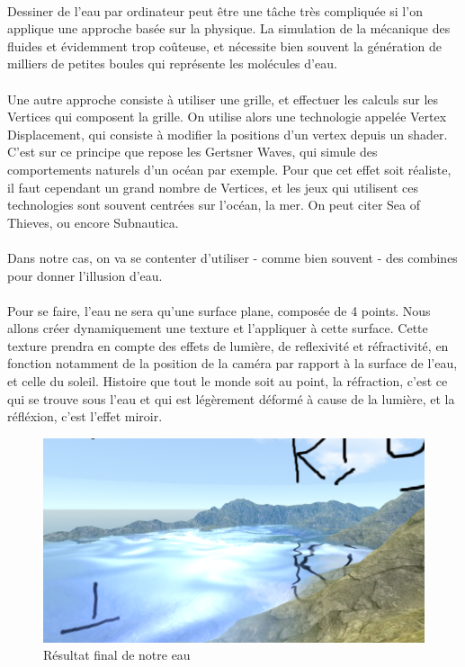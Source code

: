 \documentclass{EPUProjetDi}
\begin{document}
\paragraph{}
Dessiner de l'eau par ordinateur peut être une tâche très compliquée si l'on applique une approche basée sur la physique. La simulation de la mécanique des fluides et évidemment trop coûteuse, et nécessite bien souvent la génération de milliers de petites boules qui représente les molécules d'eau.
\paragraph{}
Une autre approche consiste à utiliser une grille, et effectuer les calculs sur les Vertices qui composent la grille. On utilise alors une technologie appelée Vertex Displacement, qui consiste à modifier la positions d'un vertex depuis un shader. 
C'est sur ce principe que repose les Gertsner Waves, qui simule des comportements naturels d'un océan par exemple. Pour que cet effet soit réaliste, il faut cependant un grand nombre de Vertices, et les jeux qui utilisent ces technologies sont souvent centrées sur l'océan, la mer. On peut citer Sea of Thieves, ou encore Subnautica.

\paragraph{}
Dans notre cas, on va se contenter d'utiliser - comme bien souvent - des combines pour donner l'illusion d'eau.
\paragraph{}
Pour se faire, l'eau ne sera qu'une surface plane, composée de 4 points. Nous allons créer dynamiquement une texture et l'appliquer à cette surface.
Cette texture prendra en compte des effets de lumière, de reflexivité et réfractivité, en fonction notamment de la position de la caméra par rapport à la surface de l'eau, et celle du soleil.
Histoire que tout le monde soit au point, la réfraction, c'est ce qui se trouve sous l'eau et qui est légèrement déformé à cause de la lumière, et la réfléxion, c'est l'effet miroir.

\begin{figure}[h]
	\centering
	\includegraphics[scale=.6]{water}
	\caption{Résultat final de notre eau}
	\label{fig:water}
\end{figure}
\end{document}
